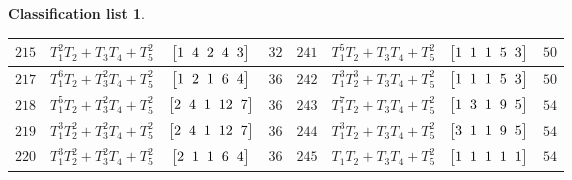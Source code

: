 \documentclass[pdftex]{sigma}%
\theoremstyle{definition}
\newtheorem{class-list}[thm]{Classification list}
\numberwithin{equation}{section}
\begin{document}
\begin{class-list}
\begin{table}[t!]
\begin{tabu}{c|c|c|c||c|c|c|c}
\hline
${215}$&${T_{1}^{2}T_{2}+T_{3}T_{4}+T_{5}^{2}}$
&$\arraycolsep=1mm\begin{bmatrix}{1} & {4} & {2} & {4} & {3}\end{bmatrix}$&${32}$
&${241}$&${T_{1}^{5}T_{2}+T_{3}T_{4}+T_{5}^{2}}$
&$\arraycolsep=1mm\begin{bmatrix}{1} & {1} & {1} & {5} & {3}\end{bmatrix}$&${50}$
\\
\hline
${217}$&${T_{1}^{6}T_{2}+T_{3}^{2}T_{4}+T_{5}^{2}}$
&$\arraycolsep=1mm\begin{bmatrix}{1} & {2} & {1} & {6} & {4}\end{bmatrix}$&${36}$
&${242}$&${T_{1}^{3}T_{2}^{3}+T_{3}T_{4}+T_{5}^{2}}$
&$\arraycolsep=1mm\begin{bmatrix}{1} & {1} & {1} & {5} & {3}\end{bmatrix}$&${50}$
\\
\hline
${218}$&${T_{1}^{5}T_{2}+T_{3}^{2}T_{4}+T_{5}^{2}}$
&$\arraycolsep=1mm\begin{bmatrix}{2} & {4} & {1} & {12} & {7}\end{bmatrix}$&${36}$
&${243}$&${T_{1}^{7}T_{2}+T_{3}T_{4}+T_{5}^{2}}$
&$\arraycolsep=1mm\begin{bmatrix}{1} & {3} & {1} & {9} & {5}\end{bmatrix}$&${54}$
\\
\hline
${219}$&${T_{1}^{3}T_{2}^{2}+T_{3}^{2}T_{4}+T_{5}^{2}}$
&$\arraycolsep=1mm\begin{bmatrix}{2} & {4} & {1} & {12} & {7}\end{bmatrix}$&${36}$
&${244}$&${T_{1}^{3}T_{2}+T_{3}T_{4}+T_{5}^{2}}$
&$\arraycolsep=1mm\begin{bmatrix}{3} & {1} & {1} & {9} & {5}\end{bmatrix}$&${54}$
\\
\hline
${220}$&${T_{1}^{3}T_{2}^{2}+T_{3}^{2}T_{4}+T_{5}^{2}}$
&$\arraycolsep=1mm\begin{bmatrix}{2} & {1} & {1} & {6} & {4}\end{bmatrix}$&${36}$
&${245}$&${T_{1}T_{2}+T_{3}T_{4}+T_{5}^{2}}$
&$\arraycolsep=1mm\begin{bmatrix}{1} & {1} & {1} & {1} & {1}\end{bmatrix}$&${54}$
\\ \hline
\end{tabu}\vspace{-2mm}
\end{table}
\end{class-list}
\end{document}
